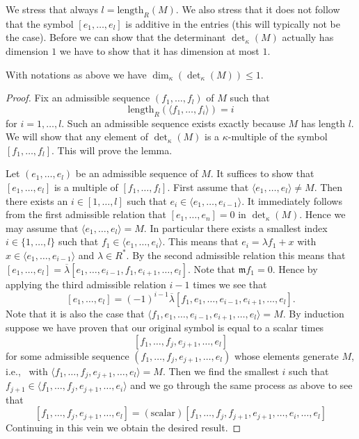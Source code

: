 \noindent
We stress that always $l = \text{length}_R(M)$. We also stress that
it does not follow that the symbol $[e_1, \ldots, e_l]$ is
additive in the entries (this will typically not be the case).
Before we can show that the determinant $\det_\kappa(M)$ actually
has dimension $1$ we have to show that it has dimension at most $1$.

\begin{lemma}
\label{lemma-dimension-at-most-one}
With notations as above we have $\dim_\kappa(\det_\kappa(M)) \leq 1$.
\end{lemma}

\begin{proof}
Fix an admissible sequence $(f_1, \ldots, f_l)$ of $M$ such that
$$
\text{length}_R(\langle f_1, \ldots, f_i\rangle) = i
$$
for $i = 1, \ldots, l$. Such an admissible sequence exists exactly because
$M$ has length $l$. We will show that any element of
$\det_\kappa(M)$ is a $\kappa$-multiple of the symbol
$[f_1, \ldots, f_l]$. This will prove the lemma.

\medskip\noindent
Let $(e_1, \ldots, e_l)$ be an admissible sequence of $M$.
It suffices to show that $[e_1, \ldots, e_l]$ is a multiple
of $[f_1, \ldots, f_l]$. First assume that
$\langle e_1, \ldots, e_l\rangle \not = M$. Then there exists
an $i \in [1, \ldots, l]$ such that
$e_i \in \langle e_1, \ldots, e_{i - 1}\rangle$. It immediately
follows from the first admissible relation that
$[e_1, \ldots, e_n] = 0$ in $\det_\kappa(M)$.
Hence we may assume that $\langle e_1, \ldots, e_l\rangle = M$.
In particular there exists a smallest index $i \in \{1, \ldots, l\}$
such that $f_1 \in \langle e_1, \ldots, e_i\rangle$. This means
that $e_i = \lambda f_1 + x$ with
$x \in \langle e_1, \ldots, e_{i - 1}\rangle$ and $\lambda \in R^*$.
By the second admissible relation this means that
$[e_1, \ldots, e_l] =
\overline{\lambda}[e_1, \ldots, e_{i - 1}, f_1, e_{i + 1}, \ldots, e_l]$.
Note that $\mathfrak m f_1 = 0$. Hence by applying the third
admissible relation $i - 1$ times we see that
$$
[e_1, \ldots, e_l] =
(-1)^{i - 1}\overline{\lambda}
[f_1, e_1, \ldots, e_{i - 1}, e_{i + 1}, \ldots, e_l].
$$
Note that it is also the case that
$ \langle f_1, e_1, \ldots, e_{i - 1}, e_{i + 1}, \ldots, e_l\rangle = M$.
By induction suppose we have proven that our original
symbol is equal to a scalar times
$$
[f_1, \ldots, f_j, e_{j + 1}, \ldots, e_l]
$$
for some admissible sequence $(f_1, \ldots, f_j, e_{j + 1}, \ldots, e_l)$
whose elements generate $M$, i.e., \ with
$\langle f_1, \ldots, f_j, e_{j + 1}, \ldots, e_l\rangle = M$.
Then we find the smallest $i$ such that
$f_{j + 1} \in \langle f_1, \ldots, f_j, e_{j + 1}, \ldots, e_i\rangle$
and we go through the same process as above to see that
$$
[f_1, \ldots, f_j, e_{j + 1}, \ldots, e_l]
=
(\text{scalar}) [f_1, \ldots, f_j, f_{j + 1}, e_{j + 1},
\ldots, \hat{e_i}, \ldots, e_l]
$$
Continuing in this vein we obtain the desired result.
\end{proof}


